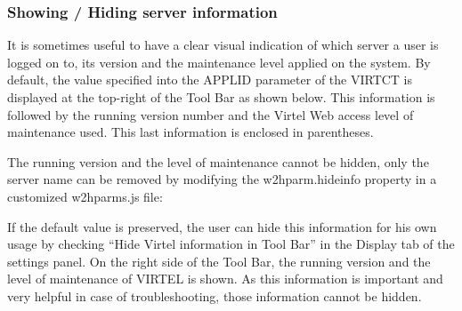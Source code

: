 \documentclass[letterpaper,10pt,english]{sphinxmanual}
\begin{document}


\ignorespaces 

\subsubsection{Showing / Hiding server information}
\label{\detokenize{Customization:showing-hiding-server-information}}\label{\detokenize{Customization:index-37}}
It is sometimes useful to have a clear visual indication of which server a user is logged on to, its version and the maintenance level applied on the system. By default, the value specified into the APPLID parameter of the VIRTCT is displayed at the top-right of the Tool Bar as shown below. This information is followed by the running version number and the Virtel Web access level of maintenance used. This last information is enclosed in parentheses.


The running version and the level of maintenance cannot be hidden, only the server name can be  removed by modifying the w2hparm.hideinfo property in a customized w2hparms.js file:

\begin{sphinxVerbatim}[commandchars=\\\{\}]
       
  
\end{sphinxVerbatim}


If the default value is preserved, the user can hide this information for his own usage by checking “Hide Virtel information in Tool Bar” in the Display tab of the settings panel. On the right side of the Tool Bar, the running version and the level of maintenance of VIRTEL is shown. As this information is important and very helpful in case of troubleshooting, those information cannot be hidden.
\end{document}
